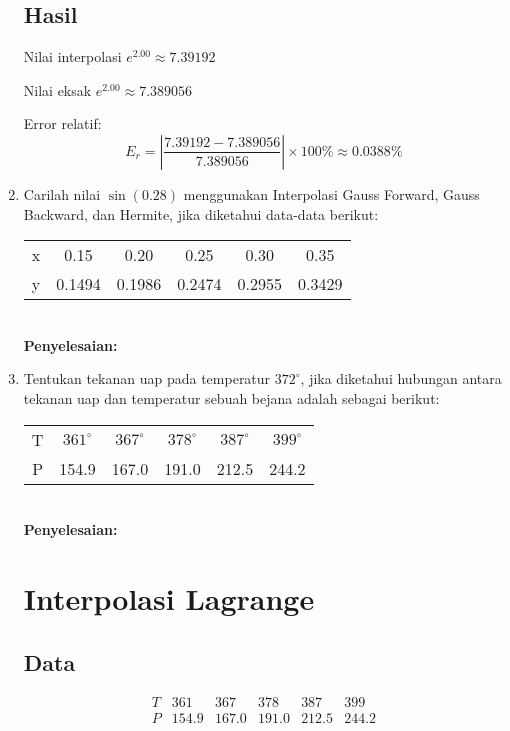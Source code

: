 \documentclass{article}
\newcommand{\penyelesaian}{\textbf{Penyelesaian: }}
\begin{document}
\begin{enumerate}
    \subsection*{Hasil}
    Nilai interpolasi \( e^{2.00} \approx 7.39192 \)

    Nilai eksak \( e^{2.00} \approx 7.389056 \)

    Error relatif:
    \[
    \text{\(E_r\)} = \left| \frac{7.39192 - 7.389056}{7.389056} \right| \times 100\% \approx 0.0388\%
    \]

    \item Carilah nilai $\sin(\num{0,28})$ menggunakan Interpolasi Gauss Forward, Gauss Backward, dan Hermite, jika diketahui data-data berikut: \\
    \begin{tabular}{ c c c c c c }
        x & \num{0,15} & \num{0,20} & \num{0,25} & \num{0,30} & \num{0,35} \\
        y & \num{0,1494} & \num{0,1986} & \num{0,2474} & \num{0,2955} & \num{0,3429} \\
    \end{tabular} \\
    \penyelesaian

    \item Tentukan tekanan uap pada temperatur $372^{\circ}$, jika diketahui hubungan antara tekanan uap dan temperatur sebuah bejana adalah sebagai berikut: \\
        \begin{tabular}{ c c c c c c }
        T & $361^{\circ}$ & $367^{\circ}$ & $378^{\circ}$ & $387^{\circ}$ & $399^{\circ}$ \\
        P & \num{154,9} & \num{167,0} & \num{191,0} & \num{212,5} & \num{244,2} \\
    \end{tabular} \\
    \penyelesaian \\
    \section*{Interpolasi Lagrange}

    \subsection*{Data}
    \[
    \begin{array}{c|ccccc}
    T & 361 & 367 & 378 & 387 & 399 \\
    \hline
    P & 154.9 & 167.0 & 191.0 & 212.5 & 244.2 \\
    \end{array}
    \]


\end{enumerate}
\end{document}
